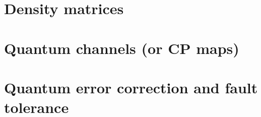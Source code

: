 \documentclass[
]{book}
\theoremstyle{definition}
\theoremstyle{definition}
\theoremstyle{definition}
\theoremstyle{remark}
\begin{document}
\hypertarget{density-matrices}{%
\chapter{Density matrices}\label{density-matrices}}

\hypertarget{quantum-channels-or-cp-maps}{%
\chapter{Quantum channels (or CP maps)}\label{quantum-channels-or-cp-maps}}

\hypertarget{quantum-error-correction-and-fault-tolerance}{%
\chapter{Quantum error correction and fault tolerance}\label{quantum-error-correction-and-fault-tolerance}}

  
\end{document}
